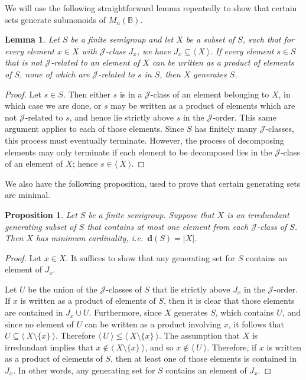 \documentclass[11pt]{article}
\newtheorem{prop}[thm]{Proposition}
\newtheorem{lemma}[thm]{Lemma}
\numberwithin{equation}{section}
\newcommand{\genset}[1]{\ensuremath{\langle\: #1 \:\rangle}}
\newcommand{\B}{\mathbb{B}}
\newcommand{\Bn}{M_n(\B)}
\newcommand{\J}{\mathscr{J}}
\begin{document}
We will use the following straightforward lemma repeatedly to show that certain
sets generate submonoids of $\Bn$.
\begin{lemma}
  Let $S$ be a finite semigroup and let $X$ be a subset of $S$, such that for
  every element $x \in X$ with $\J$-class $J_x$, we have $J_x \subseteq
  \genset{X}$. If every element $s \in S$ that is not $\J$-related to an element
  of $X$ can be written as a product of elements of $S$, none of which are
  $\J$-related to $s$ in $S$, then $X$ generates $S$. 
\end{lemma}
\begin{proof}
  Let $s \in S$. Then either $s$ is in a $\J$-class of an element belonging to
  $X$, in which case we are done, or $s$ may be written as a product of elements
  which are not $\J$-related to $s$, and hence lie strictly above $s$ in the
  $\J$-order. This same argument applies to each of those elements. Since $S$
  has finitely many $\J$-classes, this process must eventually terminate.
  However, the process of decomposing elements may only terminate if each
  element to be decomposed lies in the $\J$-class of an element of $X$; hence $s
  \in \genset{X}$.
\end{proof}

We also have the following proposition, used to prove that certain generating sets are
minimal. 
\begin{prop}
  Let $S$ be a finite semigroup. Suppose that $X$ is an irredundant generating
  subset of $S$ that contains at most one element from each $\J$-class of $S$.
  Then $X$ has minimum cardinality, i.e.\ $\mathbf{d}(S) = |X|$.
\end{prop}
\begin{proof}
  Let $x \in X$.
  It suffices to show that any generating set for $S$ contains an
  element of $J_{x}$.

  Let $U$ be the union of the $\J$-classes of $S$ that lie strictly above
  $J_{x}$ in the $\J$-order.  If $x$ is written as a product of elements of $S$,
  then it is clear that those elements are contained in $J_{x} \cup U$.
  Furthermore, since $X$ generates $S$, which contains $U$, and since no element
  of $U$ can be written as a product involving $x$, it follows that $U \subseteq
  \genset{X \setminus \{x\}}$.  Therefore $\genset{U} \leq \genset{X \setminus
  \{x\}}$. The assumption that $X$ is irredundant implies that $x \not\in
  \genset{X \setminus \{x\}}$, and so $x \not\in \genset{U}$.  Therefore, if $x$
  is written as a product of elements of $S$, then at least one of those
  elements is contained in $J_{x}$.  In other words, any generating set for $S$
  contains an element of $J_{x}$.
\end{proof}
\end{document}

